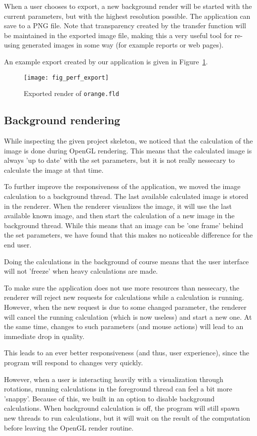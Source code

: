 When a user chooses to export, a new background render will be started with the current parameters, but with the highest resolution possible.
The application can save to a PNG file.
Note that transparency created by the transfer function will be maintained in the exported image file, making this a very useful tool for re-using generated images in some way (for example reports or web pages).

An example export created by our application is given in Figure~\ref{fig:perf:export}.

\begin{figure}[H]
	\centering
	\texttt{[image: fig\_perf\_export]}
	\caption{Exported render of \texttt{orange.fld}}
	\label{fig:perf:export}
\end{figure}

\subsection{Background rendering}
While inspecting the given project skeleton, we noticed that the calculation of the image is done during OpenGL rendering.
This means that the calculated image is always 'up to date' with the set parameters, but it is not really nessecary to calculate the image at that time.

To further improve the responsiveness of the application, we moved the image calculation to a background thread.
The last available calculated image is stored in the renderer.
When the renderer visualizes the image, it will use the last available known image, and then start the calculation of a new image in the background thread.
While this means that an image can be 'one frame' behind the set parameters, we have found that this makes no noticeable difference for the end user.

Doing the calculations in the background of course means that the user interface will not 'freeze' when heavy calculations are made.

To make sure the application does not use more resources than nessecary, the renderer will reject new requests for calculations while a calculation is running.
However, when the new request is due to some changed parameter, the renderer will cancel the running calculation (which is now useless) and start a new one.
At the same time, changes to such parameters (and mouse actions) will lead to an immediate drop in quality.

This leads to an ever better responsiveness (and thus, user experience), since the program will respond to changes very quickly.

However, when a user is interacting heavily with a visualization through rotations, running calculations in the foreground thread can feel a bit more 'snappy'.
Because of this, we built in an option to disable background calculations.
When background calculation is off, the program will still spawn new threads to run calculations, but it will wait on the result of the computation before leaving the OpenGL render routine.
